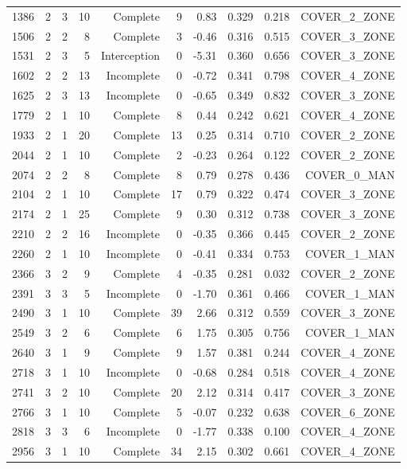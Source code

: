 \begin{tabular}{rrrrrrrrrr}
1386 & 2 & 3 & 10 & Complete & 9 & 0.83 & 0.329 & 0.218 & COVER\_2\_ZONE \\
1506 & 2 & 2 & 8 & Complete & 3 & -0.46 & 0.316 & 0.515 & COVER\_3\_ZONE \\
1531 & 2 & 3 & 5 & Interception & 0 & -5.31 & 0.360 & 0.656 & COVER\_3\_ZONE \\
1602 & 2 & 2 & 13 & Incomplete & 0 & -0.72 & 0.341 & 0.798 & COVER\_4\_ZONE \\
1625 & 2 & 3 & 13 & Incomplete & 0 & -0.65 & 0.349 & 0.832 & COVER\_3\_ZONE \\
1779 & 2 & 1 & 10 & Complete & 8 & 0.44 & 0.242 & 0.621 & COVER\_4\_ZONE \\
1933 & 2 & 1 & 20 & Complete & 13 & 0.25 & 0.314 & 0.710 & COVER\_2\_ZONE \\
2044 & 2 & 1 & 10 & Complete & 2 & -0.23 & 0.264 & 0.122 & COVER\_2\_ZONE \\
2074 & 2 & 2 & 8 & Complete & 8 & 0.79 & 0.278 & 0.436 & COVER\_0\_MAN \\
2104 & 2 & 1 & 10 & Complete & 17 & 0.79 & 0.322 & 0.474 & COVER\_3\_ZONE \\
2174 & 2 & 1 & 25 & Complete & 9 & 0.30 & 0.312 & 0.738 & COVER\_3\_ZONE \\
2210 & 2 & 2 & 16 & Incomplete & 0 & -0.35 & 0.366 & 0.445 & COVER\_2\_ZONE \\
2260 & 2 & 1 & 10 & Incomplete & 0 & -0.41 & 0.334 & 0.753 & COVER\_1\_MAN \\
2366 & 3 & 2 & 9 & Complete & 4 & -0.35 & 0.281 & 0.032 & COVER\_2\_ZONE \\
2391 & 3 & 3 & 5 & Incomplete & 0 & -1.70 & 0.361 & 0.466 & COVER\_1\_MAN \\
2490 & 3 & 1 & 10 & Complete & 39 & 2.66 & 0.312 & 0.559 & COVER\_3\_ZONE \\
2549 & 3 & 2 & 6 & Complete & 6 & 1.75 & 0.305 & 0.756 & COVER\_1\_MAN \\
2640 & 3 & 1 & 9 & Complete & 9 & 1.57 & 0.381 & 0.244 & COVER\_4\_ZONE \\
2718 & 3 & 1 & 10 & Incomplete & 0 & -0.68 & 0.284 & 0.518 & COVER\_4\_ZONE \\
2741 & 3 & 2 & 10 & Complete & 20 & 2.12 & 0.314 & 0.417 & COVER\_3\_ZONE \\
2766 & 3 & 1 & 10 & Complete & 5 & -0.07 & 0.232 & 0.638 & COVER\_6\_ZONE \\
2818 & 3 & 3 & 6 & Incomplete & 0 & -1.77 & 0.338 & 0.100 & COVER\_4\_ZONE \\
2956 & 3 & 1 & 10 & Complete & 34 & 2.15 & 0.302 & 0.661 & COVER\_4\_ZONE \\

\end{tabular}
